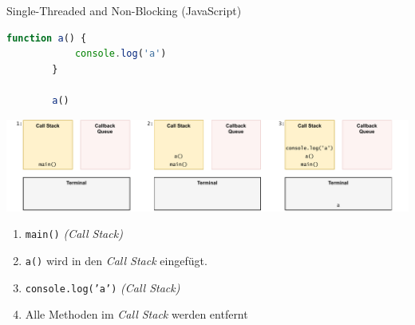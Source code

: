 \begin{example}{Single-Threaded and Non-Blocking (JavaScript)}
    \begin{lstlisting}[language=JavaScript]
        function a() {
            console.log('a')            
        }

        a()
    \end{lstlisting}

    \includegraphics[width=\textwidth]{includes/figures/example_stanb_1.pdf}

    \begin{enumerate}
        \item \texttt{main()} \emph{(Call Stack)}
        \item \texttt{a()} wird in den \emph{Call Stack} eingefügt.
        \item \texttt{console.log('a')} \emph{(Call Stack)}
        \item Alle Methoden im \emph{Call Stack} werden entfernt
    \end{enumerate}
\end{example}

